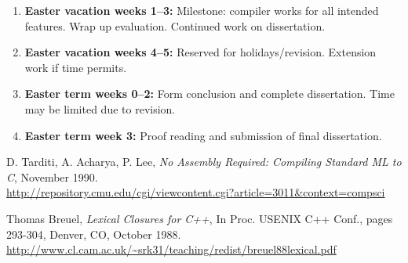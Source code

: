 \documentclass[12pt,twoside,a4paper]{article}
\begin{document}
\begin{enumerate}
\item \textbf{Easter vacation weeks 1--3:}
  Milestone: compiler works for all intended features.
  Wrap up evaluation. Continued work on dissertation.

\item \textbf{Easter vacation weeks 4--5:}
  Reserved for holidays/revision. Extension work if time permits.

\item \textbf{Easter term weeks 0--2:}
  Form conclusion and complete dissertation. Time may be limited due to revision.

\item \textbf{Easter term week 3:}
  Proof reading and submission of final dissertation.



\end{enumerate}

\begin{thebibliography}{9}

  D. Tarditi, A. Acharya, P. Lee,
  \emph{No Assembly Required: Compiling Standard ML to C},
  November 1990. \\ \url{http://repository.cmu.edu/cgi/viewcontent.cgi?article=3011&context=compsci}

  Thomas Breuel,
  \emph{Lexical Closures for C++},
  In Proc. USENIX C++ Conf., pages 293-304,
  Denver, CO, October 1988.  \\ \url{http://www.cl.cam.ac.uk/~srk31/teaching/redist/breuel88lexical.pdf}

\end{thebibliography}
\end{document}
